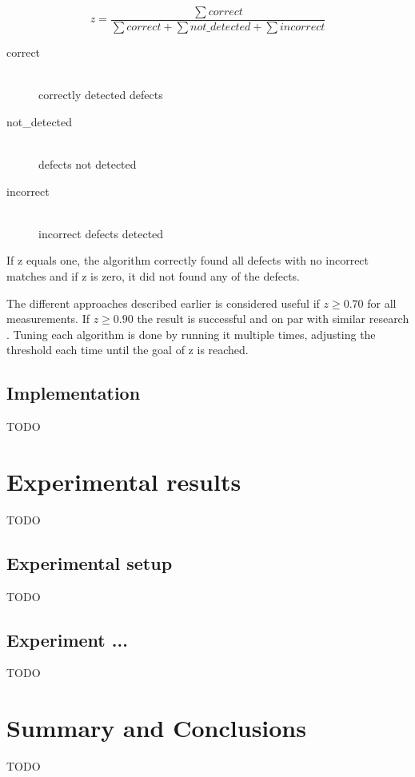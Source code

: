 \documentclass[a4paper,12pt]{article}
\begin{document}
$$z = \frac{\sum correct}{\sum correct + \sum not\_detected + \sum incorrect}$$
\begin{description}
  \item[correct] \hfill \\
  		correctly detected defects
  \item[not\_detected] \hfill \\
  		defects not detected
  \item[incorrect] \hfill \\
   		incorrect defects detected
\end{description}

If z equals one, the algorithm correctly found all defects with no incorrect matches and if z is zero, it did not found any of the defects.

The different approaches described earlier is considered useful if $z \geq 0.70$ for all measurements. If $z \geq 0.90$ the result is successful and on par with similar research \cite{frunza2006automatic, frunzaInkpen2009identification}. Tuning each algorithm is done by running it multiple times, adjusting the threshold each time until the goal of z is reached.


\subsection{Implementation}
\label{sec:implementation}
TODO

\section{Experimental results}
\label{sec:experimentalresults}
TODO

\subsection{Experimental setup}
TODO

\subsection{Experiment ...}
TODO

\section{Summary and Conclusions}
\label{sec:summary}
TODO




\end{document}
